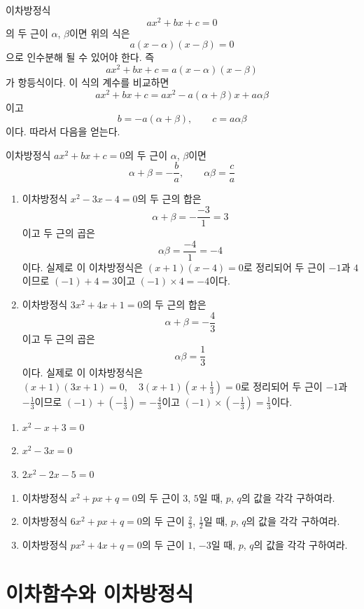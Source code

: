 \documentclass{oblivoir}
\begin{document}
이차방정식
\[ax^2+bx+c=0\]
의 두 근이 \(\alpha\), \(\beta\)이면 위의 식은
\[a(x-\alpha)(x-\beta)=0\]
으로 인수분해 될 수 있어야 한다.
즉
\[ax^2+bx+c=a(x-\alpha)(x-\beta)\]
가 항등식이다.
이 식의 계수를 비교하면
\[ax^2+bx+c=ax^2-a(\alpha+\beta)x+a\alpha\beta\]
이고
\[b=-a(\alpha+\beta),\qquad c=a\alpha\beta\]
이다.
따라서 다음을 얻는다.

\begin{mdframed}
%
이차방정식 \(ax^2+bx+c=0\)의 두 근이 \(\alpha\), \(\beta\)이면
\[\alpha+\beta=-\frac ba,\qquad \alpha\beta=\frac ca\]
\end{mdframed}

%
\exam{}
\begin{enumerate}
\item
이차방정식 \(x^2-3x-4=0\)의 두 근의 합은
\[\alpha+\beta=-\frac{-3}1=3\]
이고 두 근의 곱은
\[\alpha\beta=\frac{-4}1=-4\]
이다.
실제로 이 이차방정식은 \((x+1)(x-4)=0\)로 정리되어 두 근이 \(-1\)과 \(4\)이므로 \((-1)+4=3\)이고 
\((-1)\times4=-4\)이다.
\item
이차방정식 \(3x^2+4x+1=0\)의 두 근의 합은 
\[\alpha+\beta=-\frac43\]
이고 두 근의 곱은
\[\alpha\beta=\frac13\]
이다.
실제로 이 이차방정식은 \((x+1)(3x+1)=0,\quad3(x+1)(x+\frac13)=0\)로 정리되어 두 근이 \(-1\)과 \(-\frac13\)이므로 \((-1)+(-\frac13)=-\frac43\)이고 \((-1)\times(-\frac13)=\frac13\)이다.
\end{enumerate}

%
\begin{enumerate}\label{quad6}
\item
\(x^2-x+3=0\)
\item
\(x^2-3x=0\)
\item
\(2x^2-2x-5=0\)
\end{enumerate}

%
\prob{}
\begin{enumerate}\label{quad7}
\item
이차방정식 \(x^2+px+q=0\)의 두 근이 \(3\), \(5\)일 때, \(p\), \(q\)의 값을 각각 구하여라.
\item
이차방정식 \(6x^2+px+q=0\)의 두 근이 \(\frac23\), \(\frac12\)일 때, \(p\), \(q\)의 값을 각각 구하여라.
\item
이차방정식 \(px^2+4x+q=0\)의 두 근이 \(1\), \(-3\)일 때, \(p\), \(q\)의 값을 각각 구하여라.
\end{enumerate}

\section{이차함수와 이차방정식}
\end{document}
